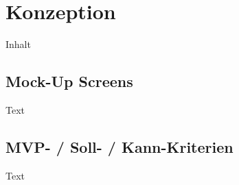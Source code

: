 \chapter{Konzeption\label{chap2:Zweites-Kapitel}}

Inhalt

\section{Mock-Up Screens\label{sec2.1:Unterpunkt-1}}

Text

\section{MVP- / Soll- / Kann-Kriterien\label{sec2.2:Unterpunkt-2}}

Text